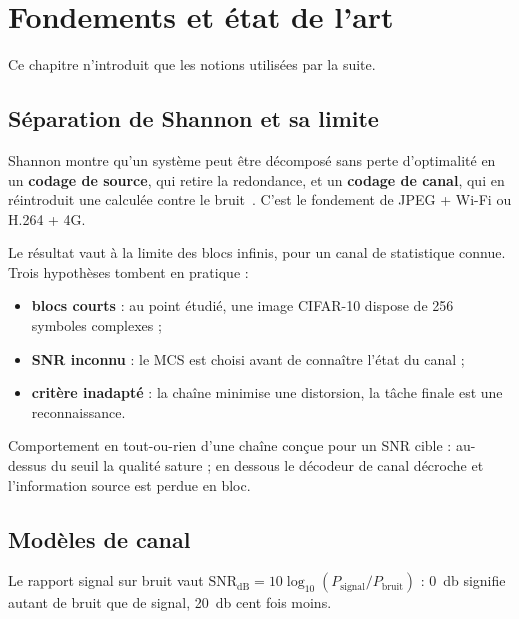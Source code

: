 \chapter{Fondements et état de l'art}
\label{chap:contexte}

Ce chapitre n'introduit que les notions utilisées par la suite.

\section{Séparation de Shannon et sa limite}
\label{sec:separation}

Shannon montre qu'un système peut être décomposé sans perte d'optimalité en un \textbf{codage de source}, qui
retire la redondance, et un \textbf{codage de canal}, qui en réintroduit une calculée contre le
bruit~\cite{shannon1948}. C'est le fondement de JPEG + Wi-Fi ou H.264 + 4G.

Le résultat vaut à la limite des blocs infinis, pour un canal de statistique connue. Trois hypothèses tombent
en pratique :

\begin{itemize}
  \item \textbf{blocs courts} : au point étudié, une image CIFAR-10 dispose de \num{256} symboles complexes ;
  \item \textbf{SNR inconnu} : le MCS est choisi avant de connaître l'état du canal ;
  \item \textbf{critère inadapté} : la chaîne minimise une distorsion, la tâche finale est une reconnaissance.
\end{itemize}

\begin{definition}
Comportement en tout-ou-rien d'une chaîne conçue pour un SNR cible : au-dessus du seuil la qualité sature ; en
dessous le décodeur de canal décroche et l'information source est perdue en bloc.
\end{definition}

\section{Modèles de canal}
\label{sec:canaux}

Le rapport signal sur bruit vaut $\mathrm{SNR_{dB}} = 10\log_{10}(P_{\text{signal}}/P_{\text{bruit}})$ :
\SI{0}{\decibel} signifie autant de bruit que de signal, \SI{20}{\decibel} cent fois moins.

